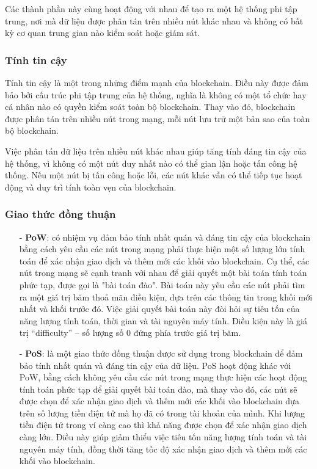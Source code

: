 Các thành phần này cùng hoạt động với nhau để tạo ra một hệ thống phi tập trung, 
nơi mà dữ liệu được phân tán trên nhiều nút khác nhau và không có bất kỳ cơ quan 
trung gian nào kiểm soát hoặc giám sát.

\subsubsection{Tính tin cậy}
Tính tin cậy là một trong những điểm mạnh của blockchain. Điều 
này được đảm bảo bởi cấu trúc phi tập trung của hệ thống, nghĩa là không có 
một tổ chức hay cá nhân nào có quyền kiểm soát toàn bộ blockchain. Thay vào đó, 
blockchain được phân tán trên nhiều nút trong mạng, mỗi nút lưu trữ một bản sao 
của toàn bộ blockchain.

Việc phân tán dữ liệu trên nhiều nút khác nhau giúp tăng tính đáng tin cậy của 
hệ thống, vì không có một nút duy nhất nào có thể gian lận hoặc tấn công hệ 
thống. Nếu một nút bị tấn công hoặc lỗi, các nút khác vẫn có thể tiếp tục 
hoạt động và duy trì tính toàn vẹn của blockchain.

\subsubsection{Giao thức đồng thuận}
\begin{itemize}
    \item[-] \textbf{PoW}: có nhiệm vụ đảm bảo 
    tính nhất quán và đáng tin cậy của blockchain bằng cách yêu cầu các nút 
    trong mạng phải thực hiện một số lượng lớn tính toán để xác nhận giao dịch
    và thêm mới các khối vào blockchain. Cụ thể, các nút trong mạng sẽ cạnh 
    tranh với nhau để giải quyết một bài toán tính toán phức tạp, được gọi là 
    "bài toán đào". Bài toán này yêu cầu các nút phải tìm ra một giá trị băm 
    thoả mãn điều kiện, dựa trên các thông tin trong khối mới nhất và khối trước đó. 
    Việc giải quyết bài toán này đòi hỏi sự tiêu tốn của năng lượng tính toán, 
    thời gian và tài nguyên máy tính. Điều kiện này là giá trị “difficulty” – 
    số lượng số 0 đứng phía trước giá trị băm.
    \item[-] \textbf{PoS}: là một giao thức đồng thuận được sử 
    dụng trong blockchain để đảm bảo tính nhất quán và đáng tin cậy của dữ 
    liệu. PoS hoạt động khác với PoW, bằng cách không yêu cầu các nút trong 
    mạng thực hiện các hoạt động tính toán phức tạp để giải quyết bài toán đào, 
    mà thay vào đó, các nút sẽ được chọn để xác nhận giao dịch và thêm mới các 
    khối vào blockchain dựa trên số lượng tiền điện tử mà họ đã có trong tài 
    khoản của mình. Khi lượng tiền điện tử trong ví càng cao thì khả năng được chọn 
    để xác nhận giao dịch càng lớn. Điều này giúp giảm thiểu việc tiêu tốn năng
    lượng tính toán và tài nguyên máy tính, đồng thời tăng tốc độ xác nhận giao
    dịch và thêm mới các khối vào blockchain.
    
\end{itemize}



